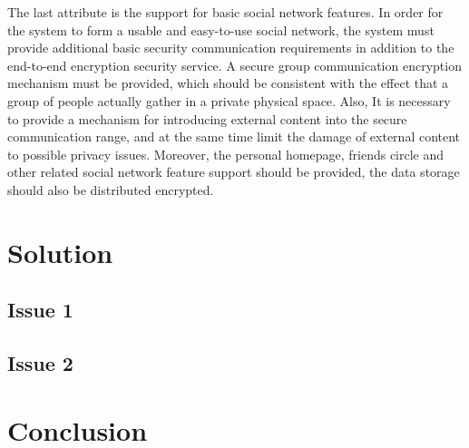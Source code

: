 \documentclass[11pt,en]{elegantpaper}
\begin{document}
The last attribute is the support for basic social network features. In order for the system to form a usable and easy-to-use social network, the system must provide additional basic security communication requirements in addition to the end-to-end encryption security service. A secure group communication encryption mechanism must be provided, which should be consistent with the effect that a group of people actually gather in a private physical space. Also, It is necessary to provide a mechanism for introducing external content into the secure communication range, and at the same time limit the damage of external content to possible privacy issues. Moreover, the personal homepage, friends circle and other related social network feature support should be provided, the data storage should also be distributed encrypted. 


\section{Solution}



\subsection{Issue 1}



\subsection{Issue 2}



\section{Conclusion}




\end{document}
